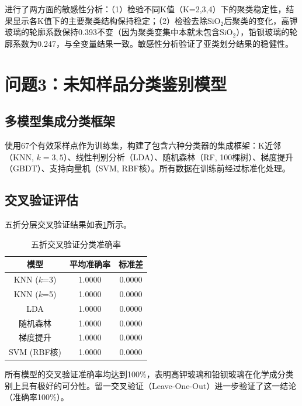 \documentclass[12pt,a4paper]{ctexart}
\begin{document}
进行了两方面的敏感性分析：（1）检验不同K值（K=2,3,4）下的聚类稳定性，结果显示各K值下的主要聚类结构保持稳定；（2）检验去除SiO$_2$后聚类的变化，高钾玻璃的轮廓系数保持0.393不变（因为聚类变集中本就未包含SiO$_2$），铅钡玻璃的轮廓系数为0.247，与全变量结果一致。敏感性分析验证了亚类划分结果的稳健性。

\section{问题3：未知样品分类鉴别模型}

\subsection{多模型集成分类框架}

使用67个有效采样点作为训练集，构建了包含六种分类器的集成框架：K近邻（KNN, $k=3,5$）、线性判别分析（LDA）、随机森林（RF, 100棵树）、梯度提升（GBDT）、支持向量机（SVM, RBF核）。所有数据在训练前经过标准化处理。

\subsection{交叉验证评估}

五折分层交叉验证结果如表\ref{tab:cv_results}所示。

\begin{table}[H]
\centering
\caption{五折交叉验证分类准确率}
\label{tab:cv_results}
\begin{tabular}{ccc}
\toprule
\textbf{模型} & \textbf{平均准确率} & \textbf{标准差} \\
\midrule
KNN ($k$=3)     & 1.0000 & 0.0000 \\
KNN ($k$=5)     & 1.0000 & 0.0000 \\
LDA             & 1.0000 & 0.0000 \\
随机森林        & 1.0000 & 0.0000 \\
梯度提升        & 1.0000 & 0.0000 \\
SVM (RBF核)    & 1.0000 & 0.0000 \\
\bottomrule
\end{tabular}
\end{table}

所有模型的交叉验证准确率均达到100\%，表明高钾玻璃和铅钡玻璃在化学成分类别上具有极好的可分性。留一交叉验证（Leave-One-Out）进一步验证了这一结论（准确率100\%）。
\end{document}
